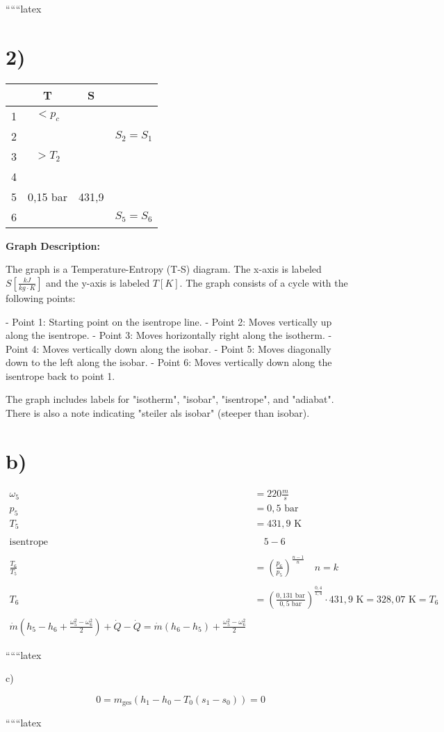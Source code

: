 
``````latex


\section*{2)}

\begin{tabular}{|c|c|c|c|}
\hline
 & T & S & \\
\hline
1 & $<p_c$ & & \\
\hline
2 & & & $S_2 = S_1$ \\
\hline
3 & $>T_2$ & & \\
\hline
4 & & & \\
\hline
5 & 0,15 bar & 431,9 & \\
\hline
6 & & & $S_5 = S_6$ \\
\hline
\end{tabular}

\bigskip

\textbf{Graph Description:}

The graph is a Temperature-Entropy (T-S) diagram. The x-axis is labeled $S \left[\frac{kJ}{kg \cdot K}\right]$ and the y-axis is labeled $T [K]$. The graph consists of a cycle with the following points:

- Point 1: Starting point on the isentrope line.
- Point 2: Moves vertically up along the isentrope.
- Point 3: Moves horizontally right along the isotherm.
- Point 4: Moves vertically down along the isobar.
- Point 5: Moves diagonally down to the left along the isobar.
- Point 6: Moves vertically down along the isentrope back to point 1.

The graph includes labels for "isotherm", "isobar", "isentrope", and "adiabat". There is also a note indicating "steiler als isobar" (steeper than isobar).

\section*{b)}

\begin{align*}
\omega_5 &= 220 \frac{m}{s} \\
p_5 &= 0,5 \text{ bar} \\
T_5 &= 431,9 \text{ K} \\
\\
\text{isentrope} & \quad 5-6 \\
\\
\frac{T_6}{T_5} &= \left( \frac{p_6}{p_5} \right)^{\frac{n-1}{n}} \quad n = k \\
\\
T_6 &= \left( \frac{0,131 \text{ bar}}{0,5 \text{ bar}} \right)^{\frac{0,4}{1,4}} \cdot 431,9 \text{ K} = 328,07 \text{ K} = T_6 \\
\\
\dot{m} \left( h_5 - h_6 + \frac{\omega_5^2 - \omega_6^2}{2} \right) + \dot{Q} - \dot{Q} = \dot{m} \left( h_6 - h_5 \right) + \frac{\omega_5^2 - \omega_6^2}{2}
\end{align*}

``````latex


c)

\[
0 = m_{\text{ges}} \left( h_1 - h_0 - T_0 (s_1 - s_0) \right) = 0
\]

``````latex



